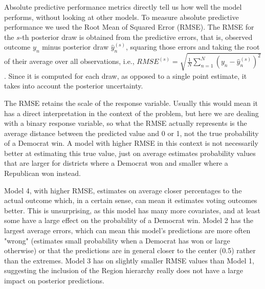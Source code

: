 \documentclass[12pt]{article}
\newcommand{\blue}[1]{\textcolor{blue}{#1}}
\begin{document}
Absolute predictive performance metrics directly tell us how well the model performs, without looking at other models.
To measure absolute predictive performance we used the Root Mean of Squared Error (RMSE). The RMSE for the $s$-th posterior draw is obtained from the predictive errors, that is, observed outcome $y_n$ minus posterior draw $\hat{y}_n^{(s)}$, squaring those errors and taking the root of their average over all observations, i.e.,
$
RMSE^{(s)} = \sqrt{
	\frac{1}{N} 
	\sum_{n = 1}^{N}
	\left( y_n - \hat{y}_n^{(s)} \right)^2
}
$.
Since it is computed for each draw, as opposed to a single point estimate, it takes into account the posterior uncertainty.



The RMSE retains the scale of the response variable.
Usually this would mean it has a direct interpretation in the context of the problem, but here we are dealing with a binary response variable, so what the RMSE actually represents is the average distance between the predicted value and 0 or 1, not the true probability of a Democrat win.
A model with higher RMSE in this context is not necessarily better at estimating this true value, just on average estimates probability values that are larger for districts where a Democrat won and smaller where a Republican won instead. 

Model 4, with higher RMSE, estimates on average closer percentages to the actual outcome which, in a certain sense, can mean it estimates voting outcomes better. This is unsurprising, as this model has many more covariates, and at least some have a large effect on the probability of a Democrat win.
Model 2 has the largest average errors, which can mean this model's predictions are more often "wrong" (estimates small probability when a Democrat has won or large otherwise) or that the predictions are in general closer to the center (0.5) rather than the extremes. 
Model 3 has on slightly smaller RMSE values than Model 1, suggesting the inclusion of the Region hierarchy really does not have a large impact on posterior predictions.
\end{document}
